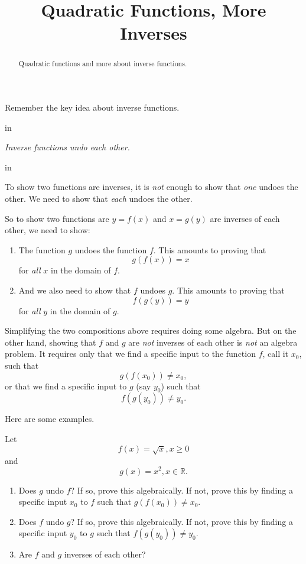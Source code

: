 \documentclass{ximera}
\title{Quadratic Functions, More Inverses}
\newcommand{\pskip}{\vskip 0.1 in}
\begin{document}
\begin{abstract}
Quadratic functions and more about inverse functions.
\end{abstract}
\maketitle

Remember the key idea about inverse functions.

\pskip

\emph{Inverse functions undo each other.}

\pskip

To show two functions are inverses, it is \emph{not} enough to show that \emph{one} undoes the other. We need to show that \emph{each} undoes the other. 

So to show two functions are $y=f(x)$ and $x=g(y)$ are inverses of each other, we need to show:

\begin{enumerate}
\item The function $g$ undoes the function $f$. This amounts to proving that
\[
        g(f(x)) = x 
\]
for \emph{all} $x$ in the domain of $f$.

\item And we also need to show that $f$ undoes $g$. This amounts to proving that
\[
        f(g(y)) = y
\]
for \emph{all} $y$ in the domain of $g$.
\end{enumerate} 

Simplifying the two compositions above requires doing some algebra. But on the other hand, showing that $f$ and $g$ are \emph{not} inverses of each other is \emph{not} an algebra problem. It requires only that we find a specific input to the function $f$, call it $x_0$, such that 
\[
    g(f(x_0)) \neq x_0 , 
\]
or that we find a specific input to $g$ (say $y_0$) such that
\[
    f(g(y_0)) \neq y_0.
\]

Here are some examples.

\begin{question}  \label{Q345rgt5t45hh}
Let 
\[
    f(x) = \sqrt{x}, x \geq 0
\]
and 
\[
  g(x) =  x^2 , x\in\mathbb{R} .
\]
\begin{enumerate}
\item Does $g$ undo $f$? If so, prove this algebraically. If not, prove this by finding a specific input $x_0$ to $f$ such that $g(f(x_0))\neq x_0$.

\item Does $f$ undo $g$? If so, prove this algebraically. If not, prove this by finding a specific input $y_0$ to $g$ such that $f(g(y_0))\neq y_0$.

\item Are $f$ and $g$ inverses of each other?
\end{enumerate}
\end{question}
\end{document}
